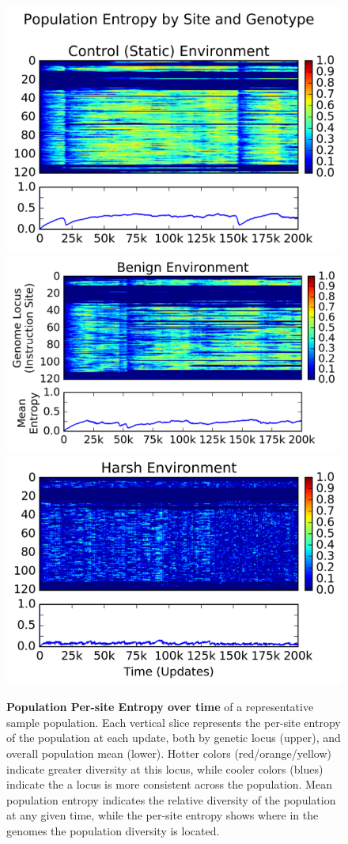 \documentclass[PhD]{msu-thesis}
\begin{document}
	\begin{figure}[!h]
	\includegraphics[trim={-0.85cm 0 0.1cm 0.2cm},clip,width=0.5\columnwidth]{figures/CE/control__entropy}
	\includegraphics[trim={0.25cm 0 0.1cm 0},clip,width=0.5\columnwidth]{figures/CE/benign__entropy}
	\includegraphics[trim={-0.85cm 0 0.1cm 0},clip,width=0.5\columnwidth]{figures/CE/harsh__entropy}
	\caption{\textbf{Population Per-site Entropy over time} of a representative sample population. Each vertical slice represents the per-site entropy of the population at each update, both by genetic locus (upper), and overall population mean (lower). Hotter colors (red/orange/yellow) indicate greater diversity at this locus, while cooler colors (blues) indicate the a locus is more consistent across the population. Mean population entropy indicates the relative diversity of the population at any given time, while the per-site entropy shows where in the genomes the population diversity is located.   %
	}\label{fig:entropy}
	\end{figure}
\end{document}
